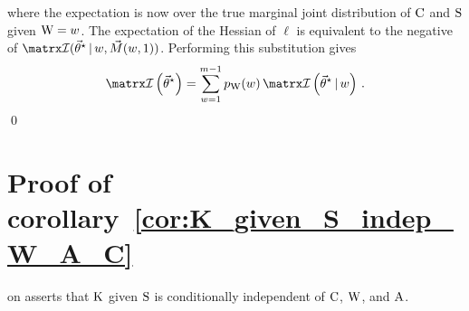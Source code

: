 \documentclass[../main.tex]{subfiles}
\begin{document}
where the expectation is now over the true marginal joint distribution of $\mathrm{C}$ and $\mathrm{S}$ given $\mathrm{W} = w$. The expectation of the Hessian of $\ell$ is equivalent to the negative of $\infomatrx(\tparam\sysparamvec \given w, \mfsi{1})$. Performing this substitution gives
\begin{equation}
    \infomatrx\left(\tparam\sysparamvec\right) = \sum_{w=1}^{m-1} \pmf_{\RV{W}}(w) \infomatrx\left(\tparam\sysparamvec \given w\right)\,.
\end{equation}
\qed


\chapter{Proof of corollary~\ref{cor:K_given_S_indep_W_A_C}}
\label{app:K_given_S_indep_W_A_C}
 on  asserts that $\mathrm{K}$ given $\mathrm{S}$ is conditionally independent of $\mathrm{C}$, $\mathrm{W}$, and $\mathrm{A}$.
\end{document}
